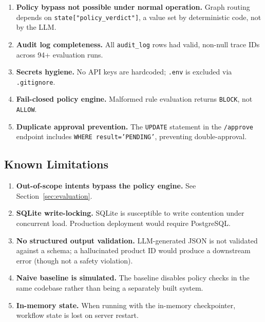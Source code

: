 \documentclass[11pt,a4paper]{article}
\begin{document}
\begin{enumerate}[leftmargin=*, itemsep=2pt]
    \item \textbf{Policy bypass not possible under normal operation.} Graph routing depends on \texttt{state["policy\_verdict"]}, a value set by deterministic code, not by the LLM.
    \item \textbf{Audit log completeness.} All \texttt{audit\_log} rows had valid, non-null trace IDs across 94+ evaluation runs.
    \item \textbf{Secrets hygiene.} No API keys are hardcoded; \texttt{.env} is excluded via \texttt{.gitignore}.
    \item \textbf{Fail-closed policy engine.} Malformed rule evaluation returns \texttt{BLOCK}, not \texttt{ALLOW}.
    \item \textbf{Duplicate approval prevention.} The \texttt{UPDATE} statement in the \texttt{/approve} endpoint includes \texttt{WHERE result='PENDING'}, preventing double-approval.
\end{enumerate}

\subsection{Known Limitations}

\begin{enumerate}[leftmargin=*, itemsep=2pt]
    \item \textbf{Out-of-scope intents bypass the policy engine.} See Section~\ref{sec:evaluation}.
    \item \textbf{SQLite write-locking.} SQLite is susceptible to write contention under concurrent load. Production deployment would require PostgreSQL.
    \item \textbf{No structured output validation.} LLM-generated JSON is not validated against a schema; a hallucinated product ID would produce a downstream error (though not a safety violation).
    \item \textbf{Naive baseline is simulated.} The baseline disables policy checks in the same codebase rather than being a separately built system.
    \item \textbf{In-memory state.} When running with the in-memory checkpointer, workflow state is lost on server restart.
\end{enumerate}

\end{document}
